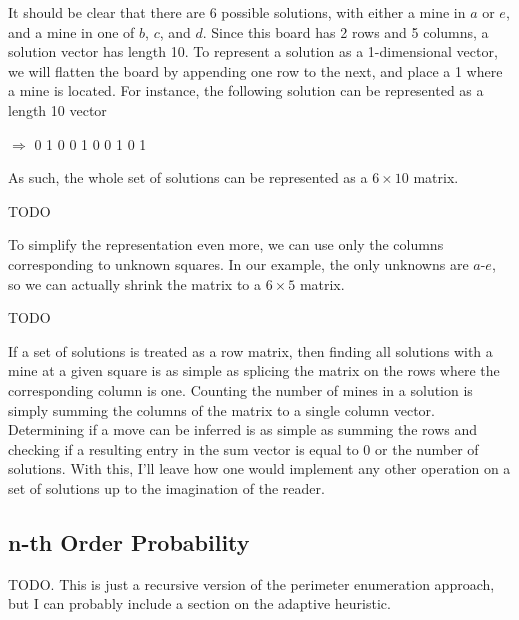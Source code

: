 It should be clear that there are 6 possible solutions, with either a mine in $a$ or $e$, and a mine in one of $b$, $c$, and $d$. Since this board has 2 rows and 5 columns, a solution vector has length 10. To represent a solution as a 1-dimensional vector, we will flatten the board by appending one row to the next, and place a 1 where a mine is located. For instance, the following solution can be represented as a length 10 vector 
\begin{center}
    \begin{minipage}{0.25\linewidth}\centering\resizebox{1\linewidth}{!}{\begin{minesweeperboard}
        \cellone \& \cellflag \& \cellunk \& \cellunk \& \cellflag \\
        \cellone \& \cellunk \& \cellflag \& \cellthree \& \cellflag \\
    \end{minesweeperboard}}\end{minipage}{\huge$\Rightarrow$}
        0  1  0  0  1  0  0  1  0  1
\end{center}

As such, the whole set of solutions can be represented as a $6\times10$ matrix.

TODO

To simplify the representation even more, we can use only the columns corresponding to unknown squares. In our example, the only unknowns are $a$-$e$, so we can actually shrink the matrix to a $6\times5$ matrix.

TODO

If a set of solutions is treated as a row matrix, then finding all solutions with a mine at a given square is as simple as splicing the matrix on the rows where the corresponding column is one. Counting the number of mines in a solution is simply summing the columns of the matrix to a single column vector. Determining if a move can be inferred is as simple as summing the rows and checking if a resulting entry in the sum vector is equal to 0 or the number of solutions. With this, I'll leave how one would implement any other operation on a set of solutions up to the imagination of the reader.

\subsection{n-th Order Probability}

TODO. This is just a recursive version of the perimeter enumeration approach, but I can probably include a section on the adaptive heuristic.

